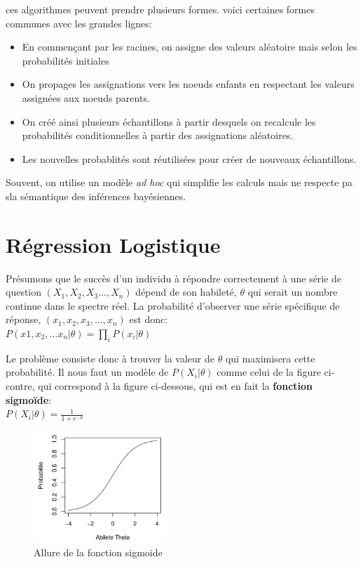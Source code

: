 \documentclass[oneside]{book}
\begin{document}
ces algorithmes peuvent prendre plusieurs formes. voici certaines formes communes avec les grandes lignes:

\begin{itemize}
\item En commençant par les racines, on assigne des valeurs aléatoire mais selon les probabilités initiales
\item On propages les assignations vers les noeuds enfants en respectant les valeurs assignées aux noeuds parents.
\item On créé ainsi plusieurs échantillons à partir desquels on recalcule les probabilités conditionnelles à partir des assignations aléatoires.
\item Les nouvelles probablités sont réutilisées pour créer de nouveaux échantillons.
\end{itemize}

Souvent, on utilise un modèle \textit{ad hoc} qui simplifie les calculs mais ne respecte pa sla sémantique des inférences bayésiennes.
\section{Régression Logistique}
Présumons que le succès d'un individu à répondre correctement à une série de question $(X_1,X_2, X_3...,X_n)$ dépend de son habileté, $\theta$ qui serait un nombre continue dans le spectre réel. La probabilité d'observer une série spécifique de réponse, $(x_1, x_2,x_3,...,x_n)$ est donc:\\

\centering
$P(x1,x_2,...x_n|\theta) = \prod\limits_i P(x_i|\theta)$
\justify

Le problème consiste donc à trouver la valeur de $\theta$ qui maximisera cette probabilité. Il nous faut un modèle de $P(X_i|\theta)$ comme celui de la figure ci-contre, qui correspond à la figure ci-dessous, qui est en fait la \textbf{fonction sigmoïde}:\\

\centering
$P(X_i|\theta) = \frac{1}{1 + e^{-\theta}}$
\justify

\begin{figure}[!ht]
\centering
\includegraphics[width = 5cm]{sigmoide.png}
\caption{Allure de la fonction sigmoide}
\label{fig:sigmoide}
\end{figure}
\end{document}
